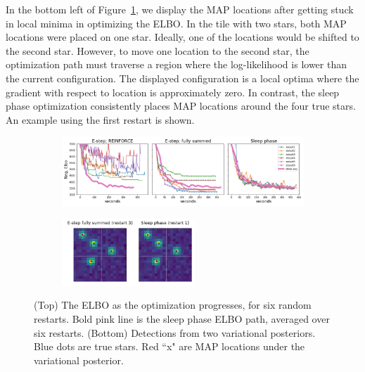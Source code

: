 In the bottom left of Figure~\ref{fig:optim_path}, we display the MAP locations after getting stuck in local minima in optimizing the ELBO. In the tile with two stars, both MAP locations were placed on one star. Ideally, one of the locations would be shifted to the second star. However, to move one location to the second star, the optimization path must traverse a region where the log-likelihood is lower than the current configuration. The displayed configuration is a local optima where the gradient with respect to location is approximately zero. In contrast, the sleep phase optimization consistently places MAP locations around the four true stars. An example using the first restart is shown. 

\begin{figure}[!htb]
    \centering
    \begin{subfigure}[t]{0.9\textwidth}
    \centering
    \includegraphics[width=\textwidth]{figures/optim_path_compare.png}
    \end{subfigure}
    \begin{subfigure}[t]{\textwidth}
    \centering
    \includegraphics[width=0.55\textwidth]{figures/optim_path_detect_compare.png}
    \end{subfigure}
    \vspace{-3em}
    \caption{(Top) The ELBO as the optimization progresses, for six random restarts. Bold pink line is the sleep phase ELBO path, averaged over six restarts. (Bottom) Detections from two variational posteriors. Blue dots are true stars. Red ``x" are MAP locations under the variational posterior. }
    \label{fig:optim_path}
\end{figure}



